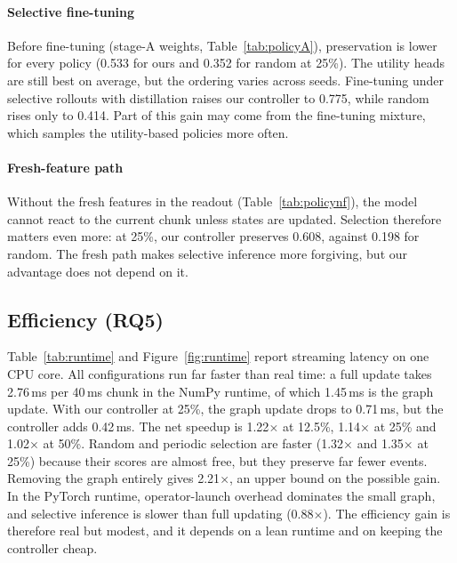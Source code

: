 \documentclass[algorithms,article,submit,pdftex,oneauthor]{Definitions/mdpi}
\providecommand{\DIFaddend}{} %
\begin{document}
\DIFaddend \paragraph*{Selective fine-tuning} Before fine-tuning (stage-A weights, Table~\ref{tab:policyA}), preservation is lower for every policy (0.533 for ours and 0.352 for random at 25\%). The utility heads are still best on average, but the ordering varies across seeds. Fine-tuning under selective rollouts with distillation raises our controller to 0.775, while random rises only to 0.414. Part of this gain may come from the fine-tuning mixture, which samples the utility-based policies more often.

\paragraph*{Fresh-feature path} Without the fresh features in the readout (Table~\ref{tab:policynf}), the model cannot react to the current chunk unless states are updated. Selection therefore matters even more: at 25\%, our controller preserves 0.608, against 0.198 for random. The fresh path makes selective inference more forgiving, but our advantage does not depend on it.


\runtimetable

\subsection{Efficiency (RQ5)}
\label{sec:h3}
Table~\ref{tab:runtime} and Figure~\ref{fig:runtime} report streaming latency on one CPU core. All configurations run far faster than real time: a full update takes 2.76\,ms per 40\,ms chunk in the NumPy runtime, of which 1.45\,ms is the graph update. With our controller at 25\%, the graph update drops to 0.71\,ms, but the controller adds 0.42\,ms. The net speedup is 1.22$\times$ at 12.5\%, 1.14$\times$ at 25\% and 1.02$\times$ at 50\%. Random and periodic selection are faster (1.32$\times$ and 1.35$\times$ at 25\%) because their scores are almost free, but they preserve far fewer events. Removing the graph entirely gives 2.21$\times$, an upper bound on the possible gain. In the PyTorch runtime, operator-launch overhead dominates the small graph, and selective inference is slower than full updating (0.88$\times$). The efficiency gain is therefore real but modest, and it depends on a lean runtime and on keeping the controller cheap.
\end{document}
